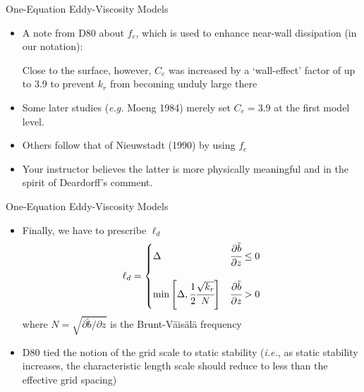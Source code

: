 
\begin{frame}{One-Equation Eddy-Viscosity Models}
\begin{itemize}
	\item A note from D80 about $f_c$, which is used to enhance near-wall dissipation (in our notation):
	\begin{fancyquotes}
		Close to the surface, however, $C_e$ was increased by a `wall-effect' factor of up to 3.9 to prevent $k_r$ from becoming unduly large there
	\end{fancyquotes}
	\item Some later studies (\textit{e.g.} Moeng 1984) merely set $C_e = 3.9$ at the first model level.
	\item Others follow that of Nieuwstadt (1990) by using $f_c$
	\item Your instructor believes the latter is more physically meaningful and in the spirit of Deardorff's comment.
\end{itemize}
\end{frame}

\begin{frame}{One-Equation Eddy-Viscosity Models}
\begin{itemize}
	\item Finally, we have to prescribe $\ell_d$
	\begin{gather*}
	\ell_d = 
	\begin{cases}
	\Delta & \cfrac{\partial \tilde{b}}{\partial z} \leq 0\\\\
	\mathrm{min}\left[\Delta,\cfrac{1}{2}\cfrac{\sqrt{k_r}}{N}\right]  & \cfrac{\partial \tilde{b}}{\partial z} > 0
	\end{cases}
	\end{gather*}
	where $N = \sqrt{\partial \tilde{b}/{\partial z}}$ is the Brunt-V\"{a}is\"{a}l\"{a} frequency 
	\item D80 tied the notion of the grid scale to static stability (\textit{i.e.}, as static stability increases, the characteristic length scale should reduce to less than the effective grid spacing)
\end{itemize}
\end{frame}


